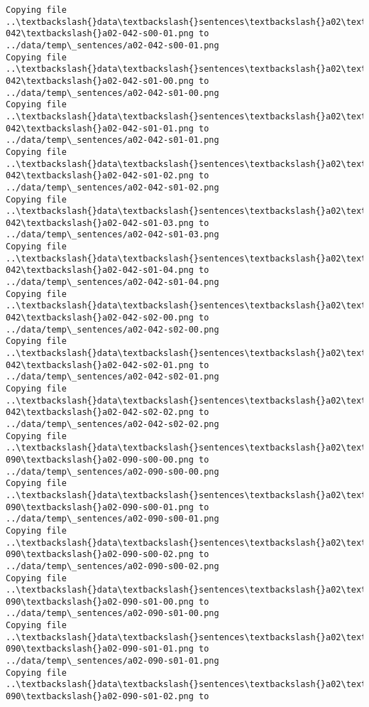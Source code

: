 \documentclass[11pt]{article}
\begin{document}
\begin{Verbatim}[commandchars=\\\{\}]
Copying file ..\textbackslash{}data\textbackslash{}sentences\textbackslash{}a02\textbackslash{}a02-042\textbackslash{}a02-042-s00-01.png to
../data/temp\_sentences/a02-042-s00-01.png
Copying file ..\textbackslash{}data\textbackslash{}sentences\textbackslash{}a02\textbackslash{}a02-042\textbackslash{}a02-042-s01-00.png to
../data/temp\_sentences/a02-042-s01-00.png
Copying file ..\textbackslash{}data\textbackslash{}sentences\textbackslash{}a02\textbackslash{}a02-042\textbackslash{}a02-042-s01-01.png to
../data/temp\_sentences/a02-042-s01-01.png
Copying file ..\textbackslash{}data\textbackslash{}sentences\textbackslash{}a02\textbackslash{}a02-042\textbackslash{}a02-042-s01-02.png to
../data/temp\_sentences/a02-042-s01-02.png
Copying file ..\textbackslash{}data\textbackslash{}sentences\textbackslash{}a02\textbackslash{}a02-042\textbackslash{}a02-042-s01-03.png to
../data/temp\_sentences/a02-042-s01-03.png
Copying file ..\textbackslash{}data\textbackslash{}sentences\textbackslash{}a02\textbackslash{}a02-042\textbackslash{}a02-042-s01-04.png to
../data/temp\_sentences/a02-042-s01-04.png
Copying file ..\textbackslash{}data\textbackslash{}sentences\textbackslash{}a02\textbackslash{}a02-042\textbackslash{}a02-042-s02-00.png to
../data/temp\_sentences/a02-042-s02-00.png
Copying file ..\textbackslash{}data\textbackslash{}sentences\textbackslash{}a02\textbackslash{}a02-042\textbackslash{}a02-042-s02-01.png to
../data/temp\_sentences/a02-042-s02-01.png
Copying file ..\textbackslash{}data\textbackslash{}sentences\textbackslash{}a02\textbackslash{}a02-042\textbackslash{}a02-042-s02-02.png to
../data/temp\_sentences/a02-042-s02-02.png
Copying file ..\textbackslash{}data\textbackslash{}sentences\textbackslash{}a02\textbackslash{}a02-090\textbackslash{}a02-090-s00-00.png to
../data/temp\_sentences/a02-090-s00-00.png
Copying file ..\textbackslash{}data\textbackslash{}sentences\textbackslash{}a02\textbackslash{}a02-090\textbackslash{}a02-090-s00-01.png to
../data/temp\_sentences/a02-090-s00-01.png
Copying file ..\textbackslash{}data\textbackslash{}sentences\textbackslash{}a02\textbackslash{}a02-090\textbackslash{}a02-090-s00-02.png to
../data/temp\_sentences/a02-090-s00-02.png
Copying file ..\textbackslash{}data\textbackslash{}sentences\textbackslash{}a02\textbackslash{}a02-090\textbackslash{}a02-090-s01-00.png to
../data/temp\_sentences/a02-090-s01-00.png
Copying file ..\textbackslash{}data\textbackslash{}sentences\textbackslash{}a02\textbackslash{}a02-090\textbackslash{}a02-090-s01-01.png to
../data/temp\_sentences/a02-090-s01-01.png
Copying file ..\textbackslash{}data\textbackslash{}sentences\textbackslash{}a02\textbackslash{}a02-090\textbackslash{}a02-090-s01-02.png to

\end{Verbatim}
\end{document}
